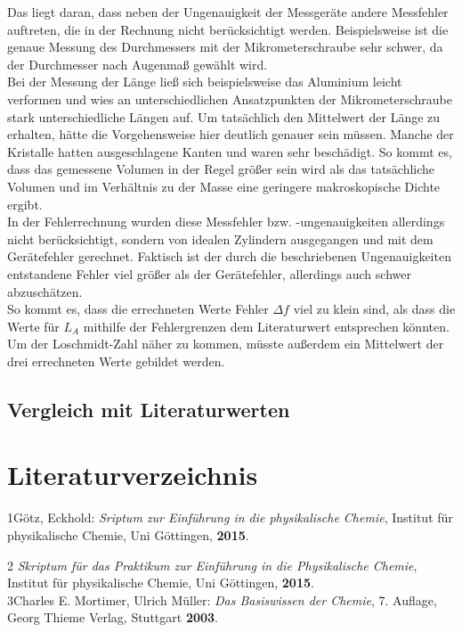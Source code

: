 \documentclass[12pt,a4paper,titlepage,headinclude,bibtotoc]{scrartcl}
\begin{document}
Das liegt daran, dass neben der Ungenauigkeit der Messgeräte andere Messfehler auftreten, die in der Rechnung nicht berücksichtigt werden. Beispielsweise ist die genaue Messung des Durchmessers mit der Mikrometerschraube sehr schwer, da der Durchmesser nach Augenmaß gewählt wird. \\
Bei der Messung der Länge ließ sich beispielsweise das Aluminium leicht verformen und wies an unterschiedlichen Ansatzpunkten der Mikrometerschraube stark unterschiedliche Längen auf. Um tatsächlich den Mittelwert der Länge zu erhalten, hätte die Vorgehensweise hier deutlich genauer sein müssen. Manche der Kristalle hatten ausgeschlagene Kanten und waren sehr beschädigt. So kommt es, dass das gemessene Volumen in der Regel größer sein wird als das tatsächliche Volumen und im Verhältnis zu der Masse eine geringere makroskopische Dichte ergibt. \\
In der Fehlerrechnung wurden diese Messfehler bzw. -ungenauigkeiten allerdings nicht berücksichtigt, sondern von idealen Zylindern ausgegangen und mit dem Gerätefehler gerechnet. Faktisch ist der durch die beschriebenen Ungenauigkeiten entstandene Fehler viel größer als der Gerätefehler, allerdings auch schwer abzuschätzen. \\
So kommt es, dass die errechneten Werte Fehler $\Delta f$ viel zu klein sind, als dass die Werte für $L_A$ mithilfe der Fehlergrenzen dem Literaturwert entsprechen könnten.
\\

Um der Loschmidt-Zahl näher zu kommen, müsste außerdem ein Mittelwert der drei errechneten Werte gebildet werden. 








\subsection{Vergleich mit Literaturwerten}

\section{Literaturverzeichnis}
1\quad Götz, Eckhold: \emph{Sriptum zur Einführung in die physikalische Chemie}, Institut für physikalische Chemie, Uni Göttingen, \textbf{2015}.

\vspace{0,5 cm}

2 \quad \emph{Skriptum für das Praktikum zur Einführung in die Physikalische Chemie}, Institut für physikalische Chemie, Uni Göttingen, \textbf{2015}.\\

3\quad Charles E. Mortimer, Ulrich Müller: \emph{Das Basiswissen der Chemie}, 7. Auflage, Georg Thieme Verlag, Stuttgart \textbf{2003}.
\end{document}
